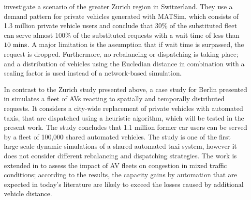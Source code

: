 \citet{boesch2016autonomous} investigate a scenario of the greater Zurich region in Switzerland. They use a demand pattern for private vehicles generated with MATSim, which consists of 1.3 million private vehicle users and conclude that $30 \%$ of the substituted fleet can serve almost $100 \%$ of the substituted
requests with a wait time of less than $10 ~ \textnormal{mins}$.
A major limitation is the assumption that if wait time is surpassed, the request is dropped.  Furthermore, no rebalancing or dispatching is taking place; and a distribution of vehicles using the Eucledian distance in combination with a scaling factor is used instead of a network-based simulation.  

In contrast to the Zurich study presented above, a case study for Berlin presented in \citep{bischoff2016simulation} simulates a fleet of AVs reacting to spatially and temporally distributed requests. It considers a city-wide replacement of private vehicles with automated taxis, that are dispatched using a heuristic algorithm, which will be tested in the present work.
 The study concludes that 1.1 million former car users can be served by a fleet  of 100,000 shared automated vehicles.
The study is one of the first large-scale dynamic simulations of a shared automated taxi system, however it does not consider  different rebalancing and dispatching strategies. The work is extended in \cite{review3} to assess the impact of AV fleets on congestion in mixed traffic conditions; according to the results, the capacity gains by automation that are expected in today's literature are likely to exceed the losses caused by additional vehicle distance.

